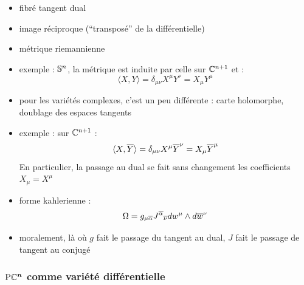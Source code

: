 \begin{itemize}
	
	\item fibré tangent dual
	
	\item image réciproque (``transposé'' de la différentielle)
	
	\item métrique riemannienne
	
	\item exemple : $\S{n}$, la métrique est induite par celle sur $\C^{n+1}$ et :
	\[\langle X, Y\rangle = \delta_{\mu \nu}X^\mu Y^\nu = X_\mu Y^\mu\]

	\item pour les variétés complexes, c'est un peu différente : carte holomorphe, doublage des espaces tangents
	
	\item exemple : sur $\C^{n+1}$ :
	\[\langle X, \congu{Y}\rangle = \delta_{\mu \nu}X^\mu \congu{Y}^\nu = X_\mu \congu{Y}^\mu\]
	En particulier, la passage au dual se fait sans changement les coefficients $X_\mu = X^\mu$
	
	\item forme kahlerienne :
	\begin{equation}
		\Omega = g_{\mu \congu{\alpha}} {J^{\congu{\alpha}}}_{\congu{\nu}} dw^\mu \wedge d\congu{w}^\nu
	\end{equation}
	
	\item moralement, là où $g$ fait le passage du tangent au dual, $J$ fait le passage de tangent au conjugé
	
\end{itemize}



\subsubsection{$\bf{\PC{n}}$ comme variété différentielle} \label{subsec:PC^n_variet}


